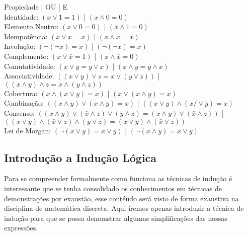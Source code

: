 \documentclass[12pt, onecolumn]{article}
\begin{document}
			Propiedade | OU | E \\ 
	\newline
	Identidade: $(x \lor 1 = 1)$ | $(x \land 0 = 0)$ \\
	\newline
	Elemento Neutro: $(x \lor 0 = 0)$ | $(x \land 1 = 0)$ \\
	\newline
	Idempotência: $(x \lor x = x)$ | $(x \land x = x)$ \\ 
	\newline
	Involução: $(\lnot(\lnot x) = x)$ | $(\lnot(\lnot x) = x)$ \\ 
	\newline
	Complemento: $(x \lor \bar{x} = 1)$ | $(x \land \bar{x} = 0)$ \\ 
	\newline
	Comutatividade: $(x \lor y = y \lor x)$ | $(x \land y = y \land x)$ \\
	\newline
	Associatividade: $((x \lor y) \lor z = x \lor (y \lor z))$ | 
	$((x \land y) \land z = x \land (y \land z))$ \\
	\newline
	Cobertura: $(x \land (x \lor y) = x)$ | $(x \lor (x \land y) = x)$ \\
	\newline
	Combinação: $((x \land y) \lor (x \land \bar{y}) = x)$ | 
	$((x \lor y) \land (x /\lor \bar{y}) = x)$ \\
	\newline
	Consenso: $((x \land y) \lor (\bar{x} \land z) \lor (y \land z) = 
	(x \land y) \lor (\bar{x} \land z))$ | 
	$((x \lor y) \land (\bar{x} \lor z) \land (y \lor z) = 
	(x \lor y) \land (\bar{x} \lor z))$ \\
	\newline
	Lei de Morgan: $(\lnot(x \lor y) = \bar{x} \lor \bar{y})$ | 
	$(\lnot(x \land y) = \bar{x} \lor \bar{y})$ \\

	\subsection{\centering Introdução a Indução Lógica}
	
	Para se compreender formalmente como funciona as técnicas de indução
	é interessante que se tenha consolidado os conhecimentos em técnicas 
	de demonstrações por exaustão, esse contéudo será visto de forma exaustiva 
	na disciplina de matemática discreta. Aqui iremos apenas introduzir a 
	técnica de indução para que se possa demonstrar algumas simplificações 
	das nossas expressões.
		
\end{document}
